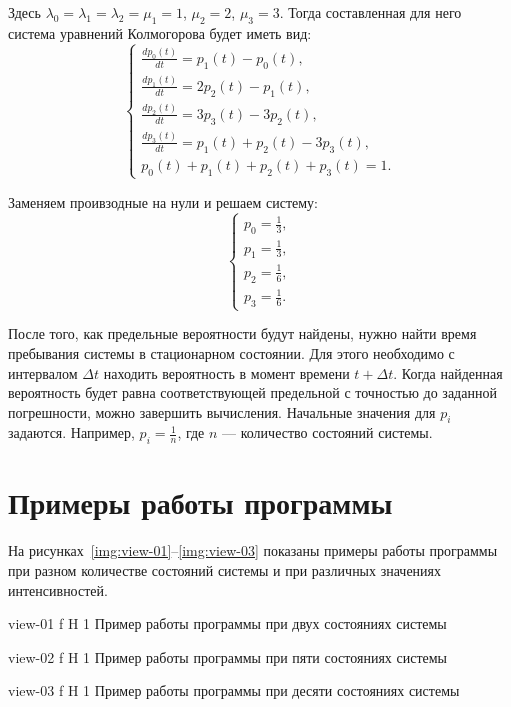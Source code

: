 \documentclass{bmstu}
\begin{document}
Здесь $\lambda _0 = \lambda _1 = \lambda _2 = \mu _1 = 1$, $\mu _2 = 2$, $\mu _3 = 3$. 
Тогда составленная для него система уравнений Колмогорова будет иметь вид:
\begin{equation}
 \begin{cases}
   \frac{dp_0(t)}{dt} = p_1(t) - p_0(t), \\
   \frac{dp_1(t)}{dt} = 2p_2(t) - p_1(t), \\
   \frac{dp_2(t)}{dt} = 3p_3(t) - 3p_2(t), \\
   \frac{dp_3(t)}{dt} = p_1(t) + p_2(t) - 3p_3(t), \\
   p_0(t) + p_1(t) + p_2(t) + p_3(t) = 1.
 \end{cases}
\end{equation}

Заменяем проивзодные на нули и решаем систему:
\begin{equation}
 \begin{cases}
   p_0 = \frac{1}{3}, \\
   p_1 = \frac{1}{3}, \\
   p_2 = \frac{1}{6}, \\
   p_3 = \frac{1}{6}.
 \end{cases}
\end{equation}

После того, как предельные вероятности будут найдены, нужно найти время пребывания системы в стационарном состоянии. 
Для этого необходимо с интервалом $\Delta t$ находить вероятность в момент времени $t + \Delta t$. 
Когда найденная вероятность будет равна соответствующей предельной с точностью до заданной погрешности,  можно завершить вычисления. 
Начальные значения для $p_i$ задаются. 
Например, $p_i = \frac{1}{n}$, где $n$ --- количество состояний системы.

\chapter{Примеры работы программы}

На рисунках~\ref{img:view-01}--\ref{img:view-03} показаны примеры работы программы при разном количестве состояний системы и при различных значениях интенсивностей.

    {view-01}
    {f}
    {H}
    {1\textwidth}
    {Пример работы программы при двух состояниях системы}
    
    {view-02}
    {f}
    {H}
    {1\textwidth}
    {Пример работы программы при пяти состояниях системы}
    
    {view-03}
    {f}
    {H}
    {1\textwidth}
    {Пример работы программы при десяти состояниях системы}
\end{document}
